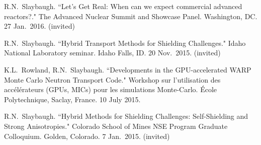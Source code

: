 \begin{bibsection}

\item R.N.\ Slaybaugh. ``Let’s Get Real: When can we expect commercial
advanced reactors?." The Advanced Nuclear Summit and Showcase Panel. Washington, DC. 27 Jan.\ 2016. (invited)

\item R.N.\ Slaybaugh. ``Hybrid Transport Methods for Shielding Challenges." Idaho National Laboratory seminar. Idaho Falls, ID. 20 Nov.\ 2015. (invited) 

\item K.L.\ Rowland, R.N.\ Slaybaugh. ``Developments in the GPU-accelerated WARP Monte Carlo Neutron Transport Code." Workshop sur l'utilisation des acc\'{e}l\'{e}rateurs (GPUs, MICs) pour les simulations Monte-Carlo. \'{E}cole Polytechnique, Saclay, France. 10 July 2015. 






\item R.N.\ Slaybaugh. ``Hybrid Methods for Shielding Challenges: Self-Shielding and Strong Anisotropies." Colorado School of Mines NSE Program Graduate Colloquium. Golden, Colorado. 7 Jan.\ 2015. (invited)


\end{bibsection}
